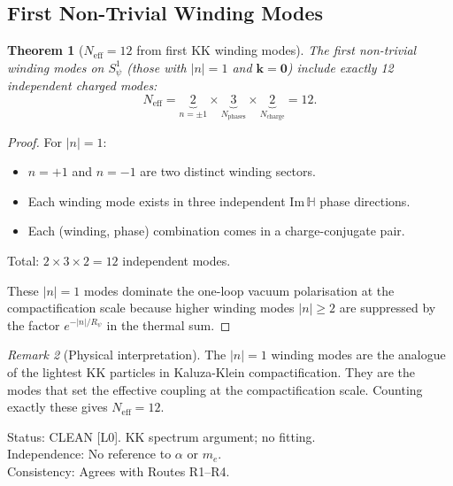 \documentclass[12pt,a4paper]{article}
\newtheorem{theorem}{Theorem}[section]
\theoremstyle{definition}
\theoremstyle{remark}
\newtheorem{remark}[theorem]{Remark}
\begin{document}
\subsection{First Non-Trivial Winding Modes}
\label{ssec:neff12:R5:first}

\begin{theorem}[$N_{\mathrm{eff}} = 12$ from first KK winding modes]
\label{thm:neff12:R5}
The first non-trivial winding modes on $S^1_\psi$ (those with $|n| = 1$ and
$\mathbf{k} = \mathbf{0}$) include exactly 12 independent charged modes:
\begin{equation}
  N_{\mathrm{eff}}
  = \underbrace{2}_{n=\pm 1}
    \times
    \underbrace{3}_{N_{\mathrm{phases}}}
    \times
    \underbrace{2}_{N_{\mathrm{charge}}}
  = 12.
  \label{eq:neff12:R5}
\end{equation}
\end{theorem}

\begin{proof}
For $|n| = 1$:
\begin{itemize}
  \item $n = +1$ and $n = -1$ are two distinct winding sectors.
  \item Each winding mode exists in three independent Im$\,\mathbb{H}$ phase directions.
  \item Each (winding, phase) combination comes in a charge-conjugate pair.
\end{itemize}
Total: $2 \times 3 \times 2 = 12$ independent modes.

These $|n|=1$ modes dominate the one-loop vacuum polarisation at the
compactification scale because higher winding modes $|n| \geq 2$ are suppressed
by the factor $e^{-|n|/R_\psi}$ in the thermal sum.
\end{proof}

\begin{remark}[Physical interpretation]
The $|n|=1$ winding modes are the analogue of the lightest KK particles in
Kaluza-Klein compactification.  They are the modes that set the effective
coupling at the compactification scale.  Counting exactly these gives $N_{\mathrm{eff}} = 12$.
\end{remark}

\begin{resultbox}
Status: CLEAN [L0].  KK spectrum argument; no fitting.\\
Independence: No reference to $\alpha$ or $m_e$.\\
Consistency: Agrees with Routes R1–R4.
\end{resultbox}
\end{document}
